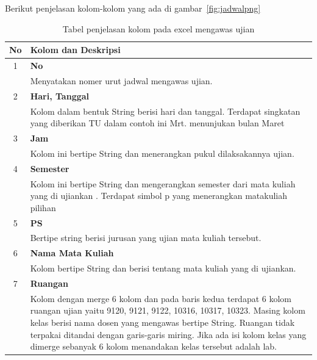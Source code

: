 Berikut penjelasan kolom-kolom yang ada di gambar~\ref{fig:jadwalpng}
\begin{table}[H]
		\centering
		\caption{Tabel penjelasan kolom pada excel mengawas ujian}
		\label{tab:penjelasan_kolom}
\begin{tabular}{|c|p{12cm}|}
		\hline
		\textbf{No} & \textbf{Kolom dan Deskripsi} \\ \hline \hline
		1 & \textbf{No}\\
			&	Menyatakan nomer urut jadwal mengawas ujian.\\ \hline
		2 & \textbf{Hari, Tanggal}\\
			&	Kolom dalam bentuk String berisi hari dan tanggal. Terdapat singkatan yang diberikan TU dalam contoh ini  Mrt. menunjukan bulan Maret\\ \hline	
		3 & \textbf{Jam}\\
			&	Kolom ini bertipe String dan menerangkan pukul dilaksakannya ujian.\\ \hline
		4 & \textbf{Semester}\\
			&	Kolom ini bertipe String dan mengerangkan semester dari mata kuliah yang di ujiankan . Terdapat simbol p yang menerangkan matakuliah pilihan\\ \hline
		5 & \textbf{PS}\\
			&	Bertipe string berisi jurusan yang ujian mata kuliah tersebut.\\ \hline
		6 & \textbf{Nama Mata Kuliah}\\
			&	Kolom bertipe String dan berisi tentang mata kuliah yang di ujiankan.\\ \hline
		7 & \textbf{Ruangan}\\
			&	Kolom dengan merge 6 kolom dan pada baris kedua terdapat 6 kolom ruangan ujian yaitu 9120, 9121, 9122, 10316, 10317, 10323. Masing kolom kelas berisi nama dosen yang mengawas bertipe String. Ruangan tidak terpakai ditandai dengan garis-garis miring. Jika ada isi kolom kelas yang dimerge sebanyak 6 kolom menandakan kelas tersebut adalah lab.\\ \hline
	\end{tabular}	
\end{table}

